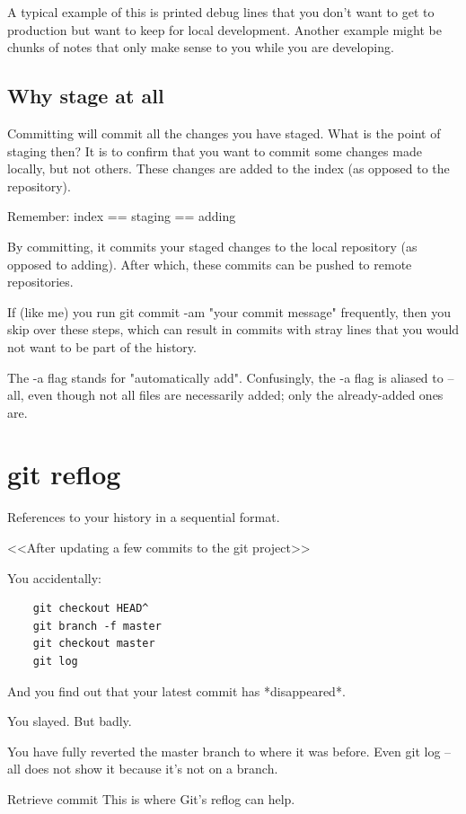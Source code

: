 \documentclass{report}
\begin{document}
A typical example of this is printed debug lines that you don't want to get to production but want to keep for local development. Another example might be chunks of notes that only make sense to you while you are developing.

\section{Why stage at all}
Committing will commit all the changes you have staged. What is the point of staging then? It is to confirm that you want to commit some changes made locally, but not others. These changes are added to the index (as opposed to the repository).

Remember: index == staging == adding

By committing, it commits your staged changes to the local repository (as opposed to adding). After which, these commits can be pushed to remote repositories.

If (like me) you run git commit -am "your commit message" frequently, then you skip over these steps, which can result in commits with stray lines that you would not want to be part of the history.

The -a flag stands for "automatically add". Confusingly, the -a flag is aliased to --all, even though not all files are necessarily added; only the already-added ones are.

\chapter{git reflog}

References to your history in a sequential format. 

<<After updating a few commits to the git project>>

You accidentally:

\begin{lstlisting}
    git checkout HEAD^
    git branch -f master
    git checkout master
    git log
\end{lstlisting}

And you find out that your latest commit has *disappeared*.

You slayed. But badly.

You have fully reverted the master branch to where it was before. Even git log --all does not show it because it's not on a branch.

Retrieve commit
This is where Git's reflog can help.
\end{document}
